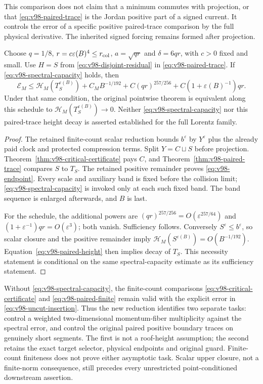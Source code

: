 This comparison does not claim that a minimum commutes with
projection, or that \eqref{eq:v98-paired-trace} is the Jordan positive
part of a signed current. It controls the error of a specific positive
paired-trace comparison by the full physical derivative. The inherited
signed forcing remains formed after projection.

\begin{theorem}
\label{thm:v98-endpoint}
Choose $q=1/8$, $r=c\varepsilon(B)^4\le r_{\rm col}$,
$a=\sqrt{qr}$ and $\delta=6qr$, with $c>0$ fixed and small.
Use $H=S$ from \eqref{eq:v98-disjoint-residual} in
\eqref{eq:v98-paired-trace}. If
\eqref{eq:v98-spectral-capacity} holds, then
\begin{equation}\label{eq:v98-endpoint}
 \mathcal E_M\le\mathcal H_M(T_S^{\varepsilon(B)})
 +C_MB^{-1/192}+C(qr)^{257/256}
                   +C(1+\varepsilon(B)^{-1})qr.
\end{equation}
Under that same condition, the original pointwise theorem is
equivalent along this schedule to
$\mathcal H_M(T_S^{\varepsilon(B)})\to0$.
Neither \eqref{eq:v98-spectral-capacity} nor this paired-trace
height decay is asserted established for the full Lorentz family.
\end{theorem}
\begin{proof}
The retained finite-count scalar reduction bounds $b^\varepsilon$
by $Y^\varepsilon$ plus the already paid clock and protected
compression terms. Split $Y=C\sqcup S$ before projection.
Theorem~\ref{thm:v98-critical-certificate} pays $C$, and
Theorem~\ref{thm:v98-paired-trace} compares $S$ to $T_S$.
The retained positive remainder proves \eqref{eq:v98-endpoint}.
Every scale and auxiliary band is fixed before the collision limit;
\eqref{eq:v98-spectral-capacity} is invoked only at each such fixed
band. The band sequence is enlarged afterwards, and $B$ is last.

For the schedule, the additional powers are
$(qr)^{257/256}=O(\varepsilon^{257/64})$ and
$(1+\varepsilon^{-1})qr=O(\varepsilon^3)$; both vanish.
Sufficiency follows. Conversely $S^\varepsilon\le b^\varepsilon$,
so scalar closure and the positive remainder imply
$\mathcal H_M(S^{\varepsilon(B)})=O(B^{-1/192})$.
Equation~\eqref{eq:v98-paired-height} then implies decay of $T_S$.
This necessity statement is conditional on the same spectral-capacity
estimate as its sufficiency statement.
\end{proof}

Without \eqref{eq:v98-spectral-capacity}, the finite-count comparisons
\eqref{eq:v98-critical-certificate} and \eqref{eq:v98-paired-finite}
remain valid with the explicit error in
\eqref{eq:v98-uncut-insertion}. Thus the new reduction identifies two
separate tasks: control a weighted two-dimensional momentum-fiber
multiplicity against the spectral error, and control the original
paired positive boundary traces on genuinely short segments. The
first is not a roof-height assumption; the second retains the exact
target selector, physical endpoints and original guard. Finite-count
finiteness does not prove either asymptotic task. Scalar upper closure,
not a finite-norm consequence, still precedes every unrestricted
point-conditioned downstream assertion.
